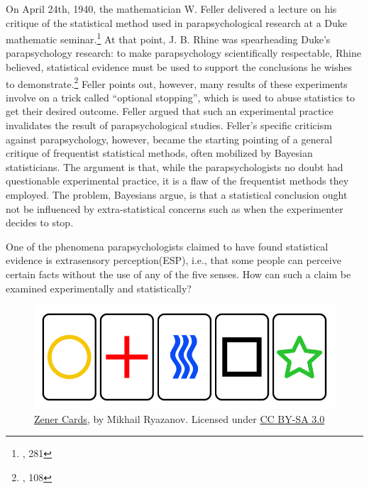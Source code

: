 On April 24th, 1940, the mathematician W. Feller delivered a lecture on
his critique of the statistical method used in parapsychological
research at a Duke mathematic seminar.\footnote{\cite{felleresp}, 281} At that point, J. B. Rhine was
spearheading Duke's parapsychology research: to make parapsychology
scientifically respectable, Rhine believed, statistical evidence must be
used to support the conclusions he wishes to demonstrate.\footnote{\cite{elusive}, 108} Feller points
out, however, many results of these experiments involve on a trick
called ``optional stopping'', which is used to abuse statistics to get
their desired outcome. Feller argued that such an experimental practice
invalidates the result of parapsychological studies. Feller's specific
criticism against parapsychology, however, became the starting pointing
of a general critique of frequentist statistical methods, often
mobilized by Bayesian statisticians. The argument is that, while the
parapsychologists no doubt had questionable experimental practice, it is
a flaw of the frequentist methods they employed. The problem, Bayesians
argue, is that a statistical conclusion ought not be influenced by
extra-statistical concerns such as when the experimenter decides to
stop.

One of the phenomena parapsychologists claimed to have found
statistical evidence is extrasensory perception(ESP), i.e., that some
people can perceive certain facts without the use of any of the five
senses. How can such a claim be examined experimentally and
statistically?

\begin{figure}[h] 
\begin{center}
\includegraphics[scale=0.4]{zener.png}
	\caption{\href{https://commons.wikimedia.org/wiki/File:Zener_cards_(color).svg}{Zener Cards}, by Mikhail Ryazanov. Licensed under \href{https://creativecommons.org/licenses/by-sa/3.0/deed.en}{CC BY-SA 3.0}}
	\label{fig:zen}
\end{center}	
\end{figure}



